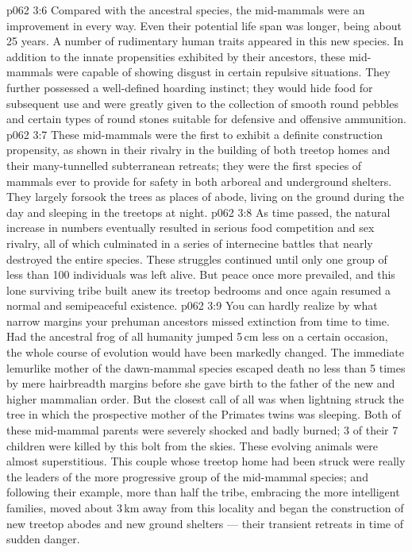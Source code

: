 \vs p062 3:6 \pc Compared with the ancestral species, the mid\hyp{}mammals were an improvement in every way. Even their potential life span was longer, being about 25 years. A number of rudimentary human traits appeared in this new species. In addition to the innate propensities exhibited by their ancestors, these mid\hyp{}mammals were capable of showing disgust in certain repulsive situations. They further possessed a well\hyp{}defined hoarding instinct; they would hide food for subsequent use and were greatly given to the collection of smooth round pebbles and certain types of round stones suitable for defensive and offensive ammunition.
\vs p062 3:7 These mid\hyp{}mammals were the first to exhibit a definite construction propensity, as shown in their rivalry in the building of both treetop homes and their many\hyp{}tunnelled subterranean retreats; they were the first species of mammals ever to provide for safety in both arboreal and underground shelters. They largely forsook the trees as places of abode, living on the ground during the day and sleeping in the treetops at night.
\vs p062 3:8 As time passed, the natural increase in numbers eventually resulted in serious food competition and sex rivalry, all of which culminated in a series of internecine battles that nearly destroyed the entire species. These struggles continued until only one group of less than 100 individuals was left alive. But peace once more prevailed, and this lone surviving tribe built anew its treetop bedrooms and once again resumed a normal and semipeaceful existence.
\vs p062 3:9 \pc You can hardly realize by what narrow margins your prehuman ancestors missed extinction from time to time. Had the ancestral frog of all humanity jumped 5\,cm less on a certain occasion, the whole course of evolution would have been markedly changed. The immediate lemurlike mother of the dawn\hyp{}mammal species escaped death no less than 5 times by mere hairbreadth margins before she gave birth to the father of the new and higher mammalian order. But the closest call of all was when lightning struck the tree in which the prospective mother of the Primates twins was sleeping. Both of these mid\hyp{}mammal parents were severely shocked and badly burned; 3 of their 7 children were killed by this bolt from the skies. These evolving animals were almost superstitious. This couple whose treetop home had been struck were really the leaders of the more progressive group of the mid\hyp{}mammal species; and following their example, more than half the tribe, embracing the more intelligent families, moved about 3\,km away from this locality and began the construction of new treetop abodes and new ground shelters --- their transient retreats in time of sudden danger.
